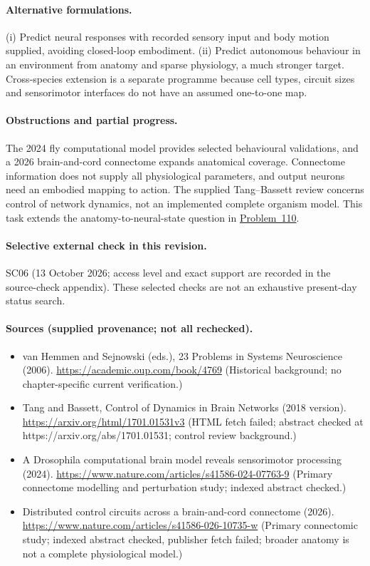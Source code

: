 \documentclass[11pt]{article}
\begin{document}
\paragraph{Alternative formulations.} (i) Predict neural responses with recorded sensory input and body motion supplied, avoiding closed-loop embodiment. (ii) Predict autonomous behaviour in an environment from anatomy and sparse physiology, a much stronger target. Cross-species extension is a separate programme because cell types, circuit sizes and sensorimotor interfaces do not have an assumed one-to-one map.
\paragraph{Obstructions and partial progress.} The 2024 fly computational model provides selected behavioural validations, and a 2026 brain-and-cord connectome expands anatomical coverage. Connectome information does not supply all physiological parameters, and output neurons need an embodied mapping to action. The supplied Tang--Bassett review concerns control of network dynamics, not an implemented complete organism model. This task extends the anatomy-to-neural-state question in \href{https://we-solve.github.io/problems/connectome-to-dynamics-map-68997257/}{Problem~110}.
\paragraph{Selective external check in this revision.} SC06 (13 October 2026; access level and exact support are recorded in the source-check appendix). These selected checks are not an exhaustive present-day status search.

\paragraph{Sources (supplied provenance; not all rechecked).} \begin{itemize}
\item van Hemmen and Sejnowski (eds.), 23 Problems in Systems Neuroscience (2006). \url{https://academic.oup.com/book/4769} (Historical background; no chapter-specific current verification.)
\item Tang and Bassett, Control of Dynamics in Brain Networks (2018 version). \url{https://arxiv.org/html/1701.01531v3} (HTML fetch failed; abstract checked at https://arxiv.org/abs/1701.01531; control review background.)
\item A Drosophila computational brain model reveals sensorimotor processing (2024). \url{https://www.nature.com/articles/s41586-024-07763-9} (Primary connectome modelling and perturbation study; indexed abstract checked.)
\item Distributed control circuits across a brain-and-cord connectome (2026). \url{https://www.nature.com/articles/s41586-026-10735-w} (Primary connectomic study; indexed abstract checked, publisher fetch failed; broader anatomy is not a complete physiological model.)
\end{itemize}
\end{document}
